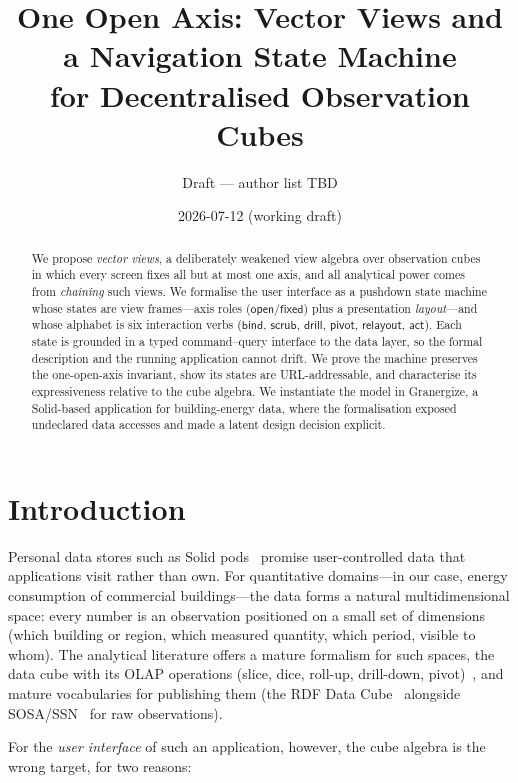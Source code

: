 \documentclass[11pt,a4paper]{article}
\title{One Open Axis: Vector Views and a Navigation State Machine\\
for Decentralised Observation Cubes}
\author{Draft --- author list TBD}
\date{2026-07-12 (working draft)}
\theoremstyle{remark}
\newcommand{\open}{\mathsf{open}}
\newcommand{\fixed}{\mathsf{fixed}}
\newcommand{\vbind}{\mathsf{bind}}
\newcommand{\vscrub}{\mathsf{scrub}}
\newcommand{\vdrill}{\mathsf{drill}}
\newcommand{\vpivot}{\mathsf{pivot}}
\newcommand{\vrelayout}{\mathsf{relayout}}
\newcommand{\vact}{\mathsf{act}}
\begin{document}
\maketitle

\begin{abstract}
We propose \emph{vector views}, a deliberately weakened view algebra over
observation cubes in which every screen fixes all but at most one axis, and all
analytical power comes from \emph{chaining} such views. We formalise the user
interface as a pushdown state machine whose states are view frames---axis roles
($\open$/$\fixed$) plus a presentation \emph{layout}---and whose alphabet is six
interaction verbs ($\vbind$, $\vscrub$, $\vdrill$, $\vpivot$, $\vrelayout$,
$\vact$). Each state is grounded in a typed command--query interface to the data
layer, so the formal description and the running application cannot drift. We
prove the machine preserves the one-open-axis invariant, show its states are
URL-addressable, and characterise its expressiveness relative to the cube
algebra. We instantiate the model in Granergize, a Solid-based application for
building-energy data, where the formalisation exposed undeclared data accesses
and made a latent design decision explicit.
\end{abstract}

\section{Introduction}\label{sec:intro}

Personal data stores such as Solid pods~\cite{solid} promise user-controlled data
that applications visit rather than own. For quantitative domains---in our case,
energy consumption of commercial buildings---the data forms a natural
multidimensional space: every number is an observation positioned on a small set of
dimensions (which building or region, which measured quantity, which period, visible
to whom). The analytical literature offers a mature formalism for such spaces, the
data cube with its OLAP operations (slice, dice, roll-up, drill-down,
pivot)~\cite{gray1997,codd1993}, and mature vocabularies for publishing them (the RDF
Data Cube~\cite{qb} alongside SOSA/SSN~\cite{sosa} for raw observations).

For the \emph{user interface} of such an application, however, the cube algebra is
the wrong target, for two reasons:
\end{document}

